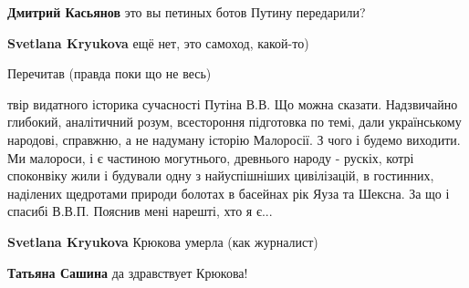 \begin{itemize}
\begin{itemize}
 
\textbf{Дмитрий Касьянов} это вы петиных ботов Путину передарили?

 
\textbf{Svetlana Kryukova} ещё нет, это самоход, какой-то)

 
Перечитав (правда поки що не весь) 

твір видатного історика сучасності Путіна В.В. Що можна сказати. Надзвичайно
глибокий, аналітичний розум, всестороння підготовка по темі, дали українському
народові, справжню, а не надуману історію Малоросії. З чого і будемо виходити.
Ми малороси, і є частиною могутнього, древнього народу - рускіх, котрі
споконвіку жили і будували одну з найуспішніших цивілізацій, в гостинних,
наділених щедротами природи болотах в басейнах рік Яуза та Шексна. За що і
спасибі В.В.П. Пояснив мені нарешті, хто я є...


 
\textbf{Svetlana Kryukova} Крюкова умерла (как журналист)

 
\textbf{Татьяна Сашина} да здравствует Крюкова!

 

\end{itemize}
\end{itemize}
